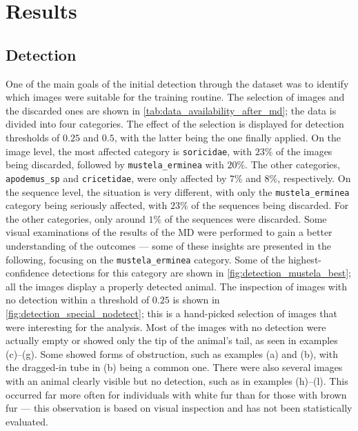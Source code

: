 

\section{Results}
\label{results}

\subsection{Detection}
One of the main goals of the initial detection through the dataset was to identify which images were suitable for the training routine.
The selection of images and the discarded ones are shown in \autoref{tab:data_availability_after_md}; the data is divided into four categories.
The effect of the selection is displayed for detection thresholds of \(0.25\) and \(0.5\), with the latter being the one finally applied.
On the image level, the most affected category is \texttt{soricidae}, with \(23\%\) of the images being discarded, followed by \texttt{mustela\_erminea} with \(20\%\).
The other categories, \texttt{apodemus\_sp} and \texttt{cricetidae}, were only affected by \(7\%\) and \(8\%\), respectively.
On the sequence level, the situation is very different, with only the \texttt{mustela\_erminea} category being seriously affected, with \(23\%\) of the sequences being discarded.
For the other categories, only around \(1\%\) of the sequences were discarded.
Some visual examinations of the results of the \ac{MD} were performed to gain a better understanding of the outcomes --- some of these insights are presented in the following, focusing on the \texttt{mustela\_erminea} category.
Some of the highest-confidence detections for this category are shown in \autoref{fig:detection_mustela_best}; all the images display a properly detected animal.
The inspection of images with no detection within a threshold of \(0.25\) is shown in \autoref{fig:detection_special_nodetect}; this is a hand-picked selection of images that were interesting for the analysis.
Most of the images with no detection were actually empty or showed only the tip of the animal's tail, as seen in examples (c)--(g).
Some showed forms of obstruction, such as examples (a) and (b), with the dragged-in tube in (b) being a common one.
There were also several images with an animal clearly visible but no detection, such as in examples (h)--(l).
This occurred far more often for individuals with white fur than for those with brown fur --- this observation is based on visual inspection and has not been statistically evaluated.

